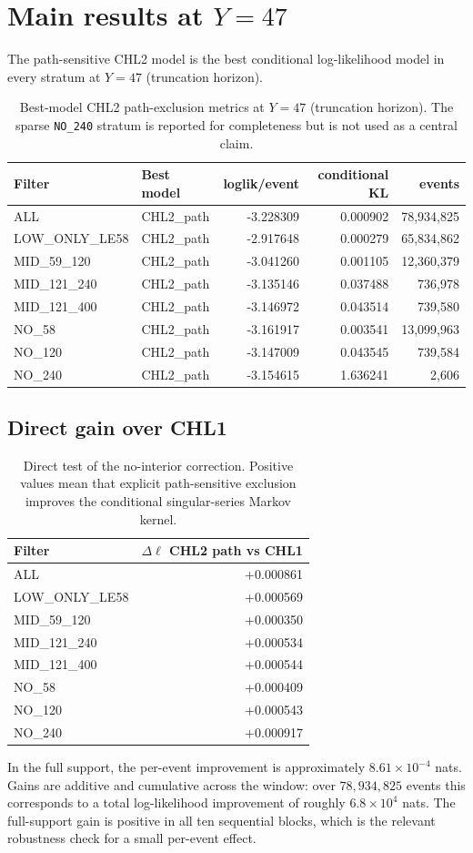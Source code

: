 \documentclass[10pt]{article}
\begin{document}
\section{Main results at $Y=47$}
The path-sensitive CHL2 model is the best conditional log-likelihood model in every stratum at $Y=47$ (truncation horizon).
\begin{table}[H]\centering\small
\begin{tabular}{llrrr}
\toprule
Filter & Best model & loglik/event & conditional KL & events \\
\midrule
ALL & CHL2\_path & -3.228309 & 0.000902 & 78,934,825 \\
LOW\_ONLY\_LE58 & CHL2\_path & -2.917648 & 0.000279 & 65,834,862 \\
MID\_59\_120 & CHL2\_path & -3.041260 & 0.001105 & 12,360,379 \\
MID\_121\_240 & CHL2\_path & -3.135146 & 0.037488 & 736,978 \\
MID\_121\_400 & CHL2\_path & -3.146972 & 0.043514 & 739,580 \\
NO\_58 & CHL2\_path & -3.161917 & 0.003541 & 13,099,963 \\
NO\_120 & CHL2\_path & -3.147009 & 0.043545 & 739,584 \\
NO\_240 & CHL2\_path & -3.154615 & 1.636241 & 2,606 \\
\bottomrule
\end{tabular}
\caption{Best-model CHL2 path-exclusion metrics at $Y=47$ (truncation horizon). The sparse \texttt{NO\_240} stratum is reported for completeness but is not used as a central claim.}\label{tab:main-chl2}\end{table}
\subsection{Direct gain over CHL1}
\begin{table}[H]\centering\small
\begin{tabular}{lr}
\toprule
Filter & $\Delta\ell$ CHL2 path vs CHL1 \\
\midrule
ALL & +0.000861 \\
LOW\_ONLY\_LE58 & +0.000569 \\
MID\_59\_120 & +0.000350 \\
MID\_121\_240 & +0.000534 \\
MID\_121\_400 & +0.000544 \\
NO\_58 & +0.000409 \\
NO\_120 & +0.000543 \\
NO\_240 & +0.000917 \\
\bottomrule
\end{tabular}
\caption{Direct test of the no-interior correction. Positive values mean that explicit path-sensitive exclusion improves the conditional singular-series Markov kernel.}\label{tab:chl2-vs-chl1}\end{table}
In the full support, the per-event improvement is approximately $8.61\times10^{-4}$ nats. Gains are additive and cumulative across the window: over $78{,}934{,}825$ events this corresponds to a total log-likelihood improvement of roughly $6.8\times10^4$ nats. The full-support gain is positive in all ten sequential blocks, which is the relevant robustness check for a small per-event effect.
\end{document}
